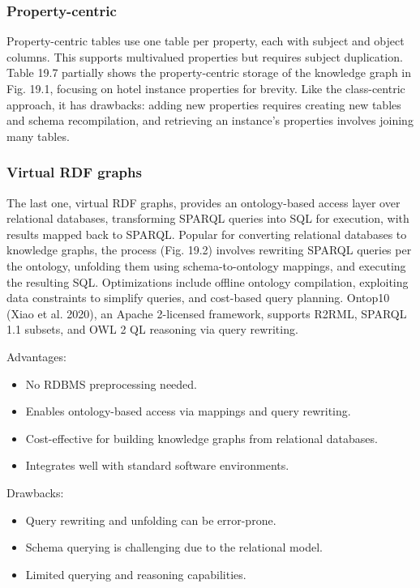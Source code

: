 \documentclass[12pt]{article}
\begin{document}
\subsubsection{Property-centric}
Property-centric tables use one table per property, each with subject and object columns. This supports multivalued properties but requires subject duplication. Table 19.7 partially shows the property-centric storage of the knowledge graph in Fig. 19.1, focusing on hotel instance properties for brevity. Like the class-centric approach, it has drawbacks: adding new properties requires creating new tables and schema recompilation, and retrieving an instance’s properties involves joining many tables.
\subsubsection{Virtual RDF graphs}
The last one, virtual RDF graphs, provides an ontology-based access layer over relational databases, transforming SPARQL queries into SQL for execution, with results mapped back to SPARQL. Popular for converting relational databases to knowledge graphs, the process (Fig. 19.2) involves rewriting SPARQL queries per the ontology, unfolding them using schema-to-ontology mappings, and executing the resulting SQL. Optimizations include offline ontology compilation, exploiting data constraints to simplify queries, and cost-based query planning. Ontop10 (Xiao et al. 2020), an Apache 2-licensed framework, supports R2RML, SPARQL 1.1 subsets, and OWL 2 QL reasoning via query rewriting.
\begin{multicols}{2}
Advantages:
\begin{itemize}
    \item No RDBMS preprocessing needed.
    \item Enables ontology-based access via mappings and query rewriting.
    \item Cost-effective for building knowledge graphs from relational databases.
    \item Integrates well with standard software environments.
\end{itemize}
\columnbreak
Drawbacks:
\begin{itemize}
    \item Query rewriting and unfolding can be error-prone.
    \item Schema querying is challenging due to the relational model.
    \item Limited querying and reasoning capabilities.
\end{itemize}
\end{multicols}
\end{document}
